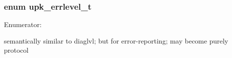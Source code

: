 \subsubsection[{upk\_\-errlevel\_\-t}]{\setlength{\rightskip}{0pt plus 5cm}enum {\bf upk\_\-errlevel\_\-t}}\label{group__upk__errors_ga179a7b997b68dd92bc7cd4602b8aa4db}
\begin{Desc}
\item[Enumerator: ]\par
\begin{description}
\item[{\em 
UPK\_\-ERRLVL\_\-ERROR\label{group__upk__errors_gga179a7b997b68dd92bc7cd4602b8aa4dba2e8866ffdd6a886515e3315b840d3f79}
}]semantically similar to diaglvl; but for error-\/reporting; may become purely protocol \end{description}
\end{Desc}

